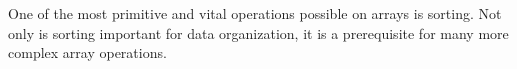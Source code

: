 \documentclass[10pt,letterpaper,twocolumn]{article}
\begin{document}
One of the most primitive and vital operations possible on arrays is sorting. Not only is sorting important for data organization, it is a prerequisite for many more complex array operations.
\end{document}

